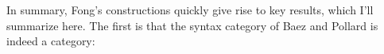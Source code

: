 \documentclass{tufte-handout-tai}
\newcommand{\cat}[1]{{\normalfont\textsf{#1}}}
\theoremstyle{plain}
\newtheorem{thm}{Theorem}[section]
\theoremstyle{definition}
\theoremstyle{remark}
\begin{document}

In summary, Fong's constructions quickly give rise to key results, which I'll summarize here. The first is that the syntax category of Baez and Pollard is indeed a category:
\end{document}

